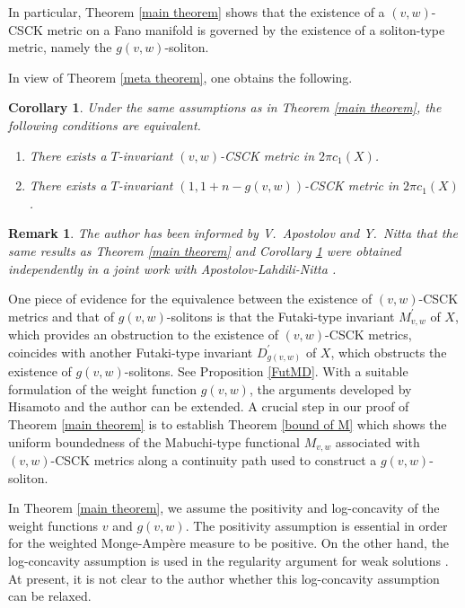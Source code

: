 \documentclass[12pt]{amsart}
\numberwithin{equation}{section}%
\theoremstyle{plain}
\newtheorem{corollary}[theorem]{Corollary}
\newtheorem{remark}[theorem]{Remark}
\theoremstyle{definition}
\newcommand{\1}{\mathbf{1}}
\begin{document}
In particular, Theorem \ref{main theorem} shows that
the existence of a $(v,w)$-CSCK metric on a Fano manifold is governed by
the existence of a soliton-type metric,
namely the $g(v,w)$-soliton.

In view of Theorem \ref{meta theorem}, one obtains the following.

\begin{corollary}\label{sub theorem}
Under the same assumptions as in Theorem \ref{main theorem},
the following conditions are equivalent.
\begin{enumerate}
\item There exists a $T$-invariant $(v,w)$-CSCK metric in $2\pi c_{1}(X)$.
\item There exists a $T$-invariant $(1, 1+n-g(v,w))$-CSCK metric in $2\pi c_{1}(X)$.
\end{enumerate}
\end{corollary}

\begin{remark}
The author has been informed by V.~Apostolov and Y.~Nitta that
the same results as Theorem \ref{main theorem} and Corollary \ref{sub theorem} 
were obtained independently in a joint work with Apostolov-Lahdili-Nitta \cite{ALN25b}.
\end{remark}

One piece of evidence for the equivalence between the existence of $(v,w)$-CSCK metrics and
that of $g(v,w)$-solitons is that the Futaki-type invariant
$M_{v,w}^{\prime}$ of $X$, which provides an obstruction to the existence of 
$(v,w)$-CSCK metrics, coincides with another Futaki-type invariant 
$D_{g(v,w)}^{\prime}$ of $X$, which obstructs the existence of $g(v,w)$-solitons.
See Proposition \ref{FutMD}.
With a suitable formulation of the weight function $g(v,w)$,
the arguments developed by Hisamoto and the author \cite{HN24} can be extended.
A crucial step in our proof of Theorem \ref{main theorem}
is to establish Theorem \ref{bound of M} which shows
the uniform boundedness of the Mabuchi-type functional $M_{v,w}$
associated with $(v,w)$-CSCK metrics
along a continuity path used to construct a $g(v,w)$-soliton.

In Theorem \ref{main theorem},
we assume the positivity and log-concavity of the weight functions $v$ and $g(v,w)$.
The positivity assumption is essential in order for the weighted Monge-Amp\`ere measure
to be positive.
On the other hand, the log-concavity assumption is used in the regularity argument for weak solutions
\cite{DJL24, DJL25, HaLi20, HanLiu25}.
At present, it is not clear to the author whether this log-concavity assumption can be relaxed.
\end{document}
